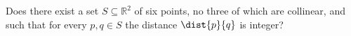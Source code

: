 Does there exist a set $S \subseteq \mathbb{R}^2$ of six points,
no three of which are collinear,
and such that for every $p, q \in S$ the distance $\dist{p}{q}$ is integer?
